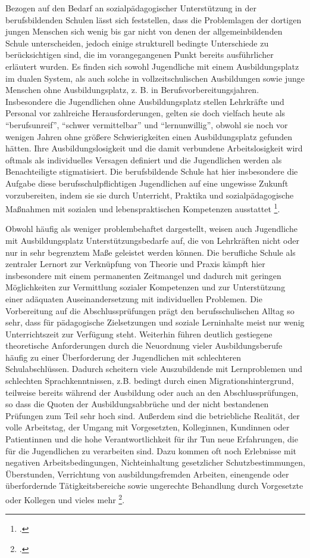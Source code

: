 Bezogen auf den Bedarf an sozialpädagogischer Unterstützung in der berufsbildenden Schulen lässt sich feststellen, dass die Problemlagen der dortigen jungen Menschen sich wenig bis gar nicht von denen der allgemeinbildenden Schule unterscheiden, jedoch einige strukturell bedingte Unterschiede zu berücksichtigen sind, die im vorangegangenen Punkt bereits ausführlicher erläutert wurden. Es finden sich sowohl Jugendliche mit einem Ausbildungsplatz im dualen System, als auch solche in vollzeitschulischen Ausbildungen sowie junge Menschen ohne Ausbildungsplatz, z. B. in Berufsvorbereitungsjahren. Insbesondere die Jugendlichen ohne Ausbildungsplatz stellen Lehrkräfte und Personal vor zahlreiche Herausforderungen, gelten sie doch vielfach heute als "`berufsunreif"', "`schwer vermittelbar"' und "`lernunwillig"', obwohl sie noch vor wenigen Jahren ohne größere Schwierigkeiten einen Ausbildungsplatz gefunden hätten. Ihre Ausbildungslosigkeit und die damit verbundene Arbeitslosigkeit wird oftmals als individuelles Versagen definiert und die Jugendlichen werden als Benachteiligte stigmatisiert. Die berufsbildende Schule hat hier insbesondere die Aufgabe diese berufsschulpflichtigen Jugendlichen auf eine ungewisse Zukunft vorzubereiten, indem sie sie durch Unterricht, Praktika und sozialpädagogische Maßnahmen mit sozialen und lebenspraktischen Kompetenzen ausstattet \footcite[vgl.][6]{ASSB2011}. 

Obwohl häufig als weniger problembehaftet dargestellt, weisen auch Jugendliche mit Ausbildungsplatz Unterstützungsbedarfe auf, die von Lehrkräften nicht oder nur in sehr begrenztem Maße geleistet werden können. Die berufliche Schule als zentraler Lernort zur Verknüpfung von Theorie und Praxis kämpft hier insbesondere mit einem permanenten Zeitmangel und dadurch mit geringen Möglichkeiten zur Vermittlung sozialer Kompetenzen und zur Unterstützung einer adäquaten Auseinandersetzung mit individuellen Problemen. Die Vorbereitung auf die Abschlussprüfungen prägt den berufsschulischen Alltag so sehr, dass für pädagogische Zielsetzungen und soziale Lerninhalte meist nur wenig Unterrichtszeit zur Verfügung steht. Weiterhin führen deutlich gestiegene theoretische Anforderungen durch die Neuordnung vieler Ausbildungsberufe häufig zu einer Überforderung der Jugendlichen mit schlechteren Schulabschlüssen. Dadurch scheitern viele Auszubildende mit Lernproblemen und schlechten Sprachkenntnissen, z.B. bedingt durch einen Migrationshintergrund, teilweise bereits während der Ausbildung oder auch an den Abschlussprüfungen, so dass die Quoten der Ausbildungsabbrüche und der nicht bestandenen Prüfungen zum Teil sehr hoch sind. Außerdem sind die betriebliche Realität, der volle Arbeitstag, der Umgang mit Vorgesetzten, Kolleginnen, Kundinnen oder Patientinnen und die hohe Verantwortlichkeit für ihr Tun neue Erfahrungen, die für die Jugendlichen zu verarbeiten sind. Dazu kommen oft noch Erlebnisse mit negativen Arbeitsbedingungen, Nichteinhaltung gesetzlicher Schutzbestimmungen, Überstunden, Verrichtung von ausbildungsfremden Arbeiten, einengende oder überfordernde Tätigkeitsbereiche sowie ungerechte Behandlung durch Vorgesetzte oder Kollegen und vieles mehr \footcite[vgl.][7]{ASSB2011}. 

